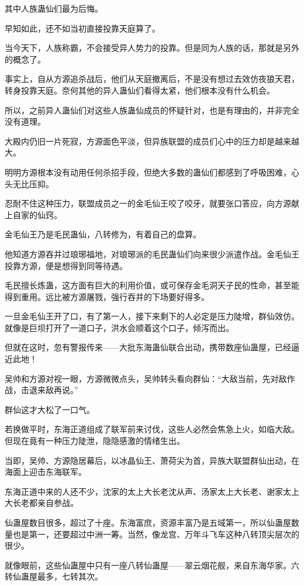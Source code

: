 \begin{this_body}
其中人族蛊仙们最为后悔。

早知如此，还不如当初直接投靠天庭算了。

当今天下，人族称霸，不会接受异人势力的投靠。但是同为人族的话，那就是另外的概念了。

事实上，自从方源追杀战后，他们从天庭撤离后，不是没有想过去效仿夜狼天君，转身投靠天庭。奈何其他的异人蛊仙们看得太紧，他们根本没有什么机会。

所以，之前异人蛊仙们对这些人族蛊仙成员的怀疑针对，也是有理由的，并非完全没有道理。

大殿内仍旧一片死寂，方源面色平淡，但异族联盟的成员们心中的压力却是越来越大。

明明方源根本没有动用任何杀招手段，但绝大多数的蛊仙们都感到了呼吸困难，心头无比压抑。

忍耐不住这种压力，联盟成员之一的金毛仙王咬了咬牙，就要张口答应，向方源献上自家的仙窍。

金毛仙王乃是毛民蛊仙，八转修为，有着自己的盘算。

他知道方源吞并过琅琊福地，对琅琊派的毛民蛊仙们向来很少派遣作战。金毛仙王投靠方源，便是想得到同等待遇。

毛民擅长炼蛊，这方面有巨大的利用价值，或可保存金毛洞天子民的性命，甚至能得到重用。远比被方源屠戮，强行吞并的下场要好得多。

一旦金毛仙王开了口，有了第一人，接下来剩下的人必定是压力陡增，群仙效仿。就像是巨坝打开了一道口子，洪水会顺着这个口子，倾泻而出。

但就在这时，忽有警报传来——大批东海蛊仙联合出动，携带数座仙蛊屋，已经逼近此地！

吴帅和方源对视一眼，方源微微点头，吴帅转头看向群仙：“大敌当前，先对敌作战，击退来敌再说。”

群仙这才大松了一口气。

若换做平时，东海正道组成了联军前来讨伐，这些人必然会焦急上火，如临大敌。但现在竟有一种压力陡泄，隐隐感激的情绪生出。

当即，吴帅、方源隐居幕后，以冰晶仙王、萧荷尖为首，异族大联盟群仙出动，在海面上迎击东海联军。

东海正道中来的人还不少，沈家的太上大长老沈从声、汤家太上大长老、谢家太上大长老都亲自参战。

仙蛊屋数目很多，超过了十座。东海富庶，资源丰富乃是五域第一，所以仙蛊屋数量也是第一，还要超过中洲一筹。当然，像龙宫、万年斗飞车这种八转顶尖层次的很少。

就像眼前，这些仙蛊屋中只有一座八转仙蛊屋——翠云烟花舰，来自东海华家。六转仙蛊屋最多，七转其次。


\end{this_body}
